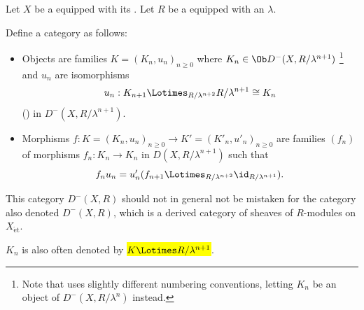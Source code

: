 \begin{definition} \label{definition:derived_category_of_bounded_above_complexes_of_adic_sheaves_on_a_scheme}
    Let $X$ be a  equipped with its . Let $R$ be a  equipped with an  $\lambda$.

    Define a category  as follows: 
    \begin{itemize}
        \item Objects are families $K = (K_n, u_n)_{n \geq 0}$ where $K_n \in \Ob D^-(X, R/\lambda^{n+1})$
        \footnote{Note that \cite[I.I.2]{deligne_lcwii} uses slightly different numbering conventions, letting $K_n$ be an object of $D^-(X, R/\lambda^n)$ instead.} and $u_n$ are isomorphisms
        $$u_n: K_{n+1} \Lotimes_{R / \lambda^{n+2}} R/\lambda^{n+1} \cong K_n$$
        ()
        in $D^-(X, R/\lambda^{n+1})$.

        \item Morphisms $f: K = (K_n, u_n)_{n \geq 0} \to K' = (K'_n, u'_n)_{n \geq 0}$ are families $(f_n)$ of morphisms $f_n: K_n \to K_n$ in $D(X, R/\lambda^{n+1})$ such that 
        $$f_n u_n = u_n' (f_{n+1} \Lotimes_{R/\lambda^{n+2}} \id_{R/\lambda^{n+1}}) .$$
    \end{itemize}
    This category $D^-(X,R)$ should not in general not be mistaken for the category also denoted $D^-(X,R)$, which is a derived category of sheaves of $R$-modules on $X_{\mathrm{\acute{e}t}}$.

    $K_n$ is also often denoted by \hl{$K \Lotimes R/\lambda^{n+1}$}.

\end{definition}